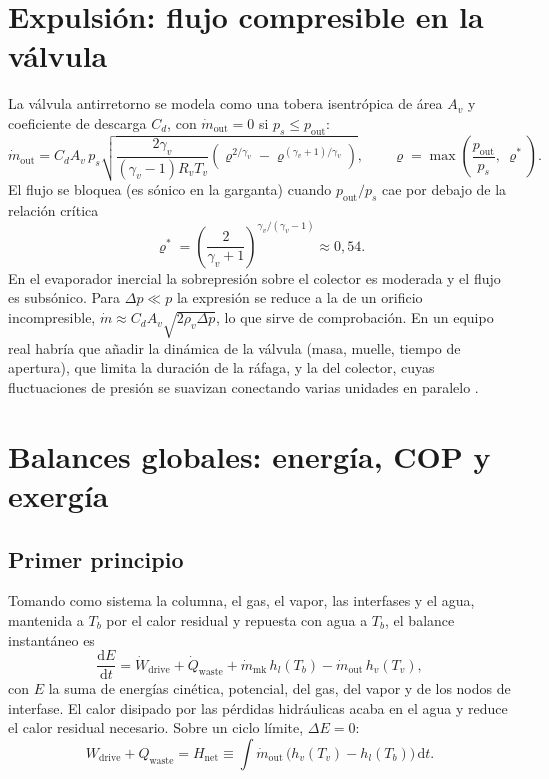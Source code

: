 \documentclass[11pt,a4paper]{article}
\newcommand{\dd}{\mathrm{d}}
\newcommand{\mdot}{\dot m}
\newcommand{\Qdot}{\dot Q}
\newcommand{\Wdot}{\dot W}
\begin{document}
\section{Expulsión: flujo compresible en la válvula}

La válvula antirretorno se modela como una tobera isentrópica de área $A_v$ y coeficiente de descarga $C_d$, con $\mdot_{\mathrm{out}}=0$ si $p_s \le p_{\mathrm{out}}$:
\begin{equation}
\mdot_{\mathrm{out}} = C_d A_v\,p_s\sqrt{\frac{2\gamma_v}{(\gamma_v-1)R_vT_v}\left(\varrho^{2/\gamma_v} - \varrho^{(\gamma_v+1)/\gamma_v}\right)},\qquad
\varrho = \max\!\left(\frac{p_{\mathrm{out}}}{p_s},\ \varrho^*\right).
\end{equation}
El flujo se bloquea (es sónico en la garganta) cuando $p_{\mathrm{out}}/p_s$ cae por debajo de la relación crítica
\begin{equation}
\varrho^* = \left(\frac{2}{\gamma_v+1}\right)^{\gamma_v/(\gamma_v-1)}\approx 0{,}54 .
\end{equation}
En el evaporador inercial la sobrepresión sobre el colector es moderada y el flujo es subsónico. Para $\Delta p\ll p$ la expresión se reduce a la de un orificio incompresible, $\mdot\approx C_dA_v\sqrt{2\rho_v\Delta p}$, lo que sirve de comprobación. En un equipo real habría que añadir la dinámica de la válvula (masa, muelle, tiempo de apertura), que limita la duración de la ráfaga, y la del colector, cuyas fluctuaciones de presión se suavizan conectando varias unidades en paralelo \cite{hydramtech}.

\section{Balances globales: energía, COP y exergía}\label{sec:exergia}

\subsection{Primer principio}

Tomando como sistema la columna, el gas, el vapor, las interfases y el agua, mantenida a $T_b$ por el calor residual y repuesta con agua a $T_b$, el balance instantáneo es
\begin{equation}
\frac{\dd E}{\dd t} = \Wdot_{\mathrm{drive}} + \Qdot_{\mathrm{waste}} + \mdot_{\mathrm{mk}}\,h_l(T_b) - \mdot_{\mathrm{out}}\,h_v(T_v),
\end{equation}
con $E$ la suma de energías cinética, potencial, del gas, del vapor y de los nodos de interfase. El calor disipado por las pérdidas hidráulicas acaba en el agua y reduce el calor residual necesario. Sobre un ciclo límite, $\Delta E = 0$:
\begin{equation}
W_{\mathrm{drive}} + Q_{\mathrm{waste}} = H_{\mathrm{net}} \equiv \int \mdot_{\mathrm{out}}\,\bigl(h_v(T_v) - h_l(T_b)\bigr)\,\dd t .
\end{equation}
\end{document}
